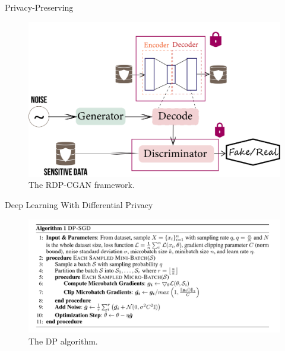 \documentclass{beamer}
\begin{document}
\begin{frame}{Privacy-Preserving}

\begin{figure}[ht]
\centering
\includegraphics[scale=0.35]{_img/rdp-cgan.png}
\caption{The RDP-CGAN framework.}
\label{fig:rdp-model}
\end{figure}

\end{frame}


\begin{frame}{Deep Learning With Differential Privacy}

\begin{figure}[ht]
\centering
\includegraphics[scale=0.18]{_img/algo.png}
\caption{The DP algorithm.}
\label{fig:algorithmdp}
\end{figure}

\end{frame}
\end{document}
